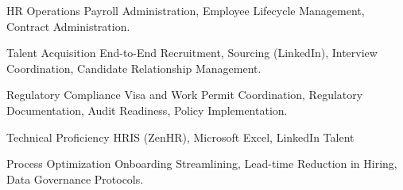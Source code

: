 
\begin{cvskills}

  \cvskill
    {HR Operations}
    {Payroll Administration, Employee Lifecycle Management, Contract Administration.}

  \cvskill
    {Talent Acquisition}
    {End-to-End Recruitment, Sourcing (LinkedIn), Interview Coordination, Candidate Relationship Management.}

  \cvskill
    {Regulatory Compliance}
    {Visa and Work Permit Coordination, Regulatory Documentation, Audit Readiness, Policy Implementation.}

  \cvskill
    {Technical Proficiency}
    {HRIS (ZenHR), Microsoft Excel, LinkedIn Talent}

  \cvskill
    {Process Optimization}
    {Onboarding Streamlining, Lead-time Reduction in Hiring, Data Governance Protocols.}

\end{cvskills}
